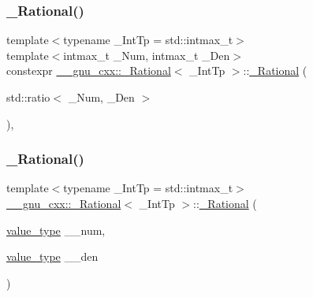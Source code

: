 \mbox{\label{class____gnu__cxx_1_1__Rational_a91518eab598825b097de41c78fb4d180}} 
\subsubsection{\texorpdfstring{\+\_\+\+Rational()}{\_Rational()}\hspace{0.1cm}{\footnotesize\ttfamily [3/4]}}
{\footnotesize\ttfamily template$<$typename \+\_\+\+Int\+Tp = std\+::intmax\+\_\+t$>$ \\
template$<$intmax\+\_\+t \+\_\+\+Num, intmax\+\_\+t \+\_\+\+Den$>$ \\
constexpr \hyperlink{class____gnu__cxx_1_1__Rational}{\+\_\+\+\_\+gnu\+\_\+cxx\+::\+\_\+\+Rational}$<$ \+\_\+\+Int\+Tp $>$\+::\hyperlink{class____gnu__cxx_1_1__Rational}{\+\_\+\+Rational} (\begin{DoxyParamCaption}\item[{std\+::ratio$<$ \+\_\+\+Num, \+\_\+\+Den $>$}]{ }\end{DoxyParamCaption})\hspace{0.3cm}{\ttfamily [inline]}, {\ttfamily [explicit]}}

\mbox{\label{class____gnu__cxx_1_1__Rational_ac660493bbbb5982cd108897296813d81}} 
\subsubsection{\texorpdfstring{\+\_\+\+Rational()}{\_Rational()}\hspace{0.1cm}{\footnotesize\ttfamily [4/4]}}
{\footnotesize\ttfamily template$<$typename \+\_\+\+Int\+Tp = std\+::intmax\+\_\+t$>$ \\
\hyperlink{class____gnu__cxx_1_1__Rational}{\+\_\+\+\_\+gnu\+\_\+cxx\+::\+\_\+\+Rational}$<$ \+\_\+\+Int\+Tp $>$\+::\hyperlink{class____gnu__cxx_1_1__Rational}{\+\_\+\+Rational} (\begin{DoxyParamCaption}\item[{\hyperlink{class____gnu__cxx_1_1__Rational_a7987be70fc59d0d980621fd65828b74a}{value\+\_\+type}}]{\+\_\+\+\_\+num,  }\item[{\hyperlink{class____gnu__cxx_1_1__Rational_a7987be70fc59d0d980621fd65828b74a}{value\+\_\+type}}]{\+\_\+\+\_\+den }\end{DoxyParamCaption})\hspace{0.3cm}{\ttfamily [inline]}}



